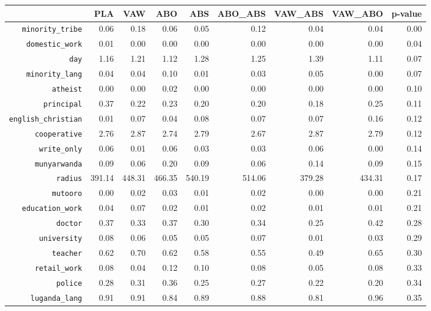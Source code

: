 \begin{longtable}{rrrrrrrrr}
  \hline
 & PLA & VAW & ABO & ABS & ABO\_ABS & VAW\_ABS & VAW\_ABO & p-value \\ 
  \hline
{\texttt{minority\_tribe}} & 0.06 & 0.18 & 0.06 & 0.05 & 0.12 & 0.04 & 0.04 & 0.00 \\ 
  {\texttt{domestic\_work}} & 0.01 & 0.00 & 0.00 & 0.00 & 0.00 & 0.00 & 0.00 & 0.04 \\ 
  {\texttt{day}} & 1.16 & 1.21 & 1.12 & 1.28 & 1.25 & 1.39 & 1.11 & 0.07 \\ 
  {\texttt{minority\_lang}} & 0.04 & 0.04 & 0.10 & 0.01 & 0.03 & 0.05 & 0.00 & 0.07 \\ 
  {\texttt{atheist}} & 0.00 & 0.00 & 0.02 & 0.00 & 0.00 & 0.00 & 0.00 & 0.10 \\ 
  {\texttt{principal}} & 0.37 & 0.22 & 0.23 & 0.20 & 0.20 & 0.18 & 0.25 & 0.11 \\ 
  {\texttt{english\_christian}} & 0.01 & 0.07 & 0.04 & 0.08 & 0.07 & 0.07 & 0.16 & 0.12 \\ 
  {\texttt{cooperative}} & 2.76 & 2.87 & 2.74 & 2.79 & 2.67 & 2.87 & 2.79 & 0.12 \\ 
  {\texttt{write\_only}} & 0.06 & 0.01 & 0.06 & 0.03 & 0.03 & 0.06 & 0.00 & 0.14 \\ 
  {\texttt{munyarwanda}} & 0.09 & 0.06 & 0.20 & 0.09 & 0.06 & 0.14 & 0.09 & 0.15 \\ 
  {\texttt{radius}} & 391.14 & 448.31 & 466.35 & 540.19 & 514.06 & 379.28 & 434.31 & 0.17 \\ 
  {\texttt{mutooro}} & 0.00 & 0.02 & 0.03 & 0.01 & 0.02 & 0.00 & 0.00 & 0.21 \\ 
  {\texttt{education\_work}} & 0.04 & 0.07 & 0.02 & 0.01 & 0.02 & 0.01 & 0.01 & 0.21 \\ 
  {\texttt{doctor}} & 0.37 & 0.33 & 0.37 & 0.30 & 0.34 & 0.25 & 0.42 & 0.28 \\ 
  {\texttt{university}} & 0.08 & 0.06 & 0.05 & 0.05 & 0.07 & 0.01 & 0.03 & 0.29 \\ 
  {\texttt{teacher}} & 0.62 & 0.70 & 0.62 & 0.58 & 0.55 & 0.49 & 0.65 & 0.30 \\ 
  {\texttt{retail\_work}} & 0.08 & 0.04 & 0.12 & 0.10 & 0.08 & 0.05 & 0.08 & 0.33 \\ 
  {\texttt{police}} & 0.28 & 0.31 & 0.36 & 0.25 & 0.27 & 0.22 & 0.20 & 0.34 \\ 
  {\texttt{luganda\_lang}} & 0.91 & 0.91 & 0.84 & 0.89 & 0.88 & 0.81 & 0.96 & 0.35 \\ 

\end{longtable}
